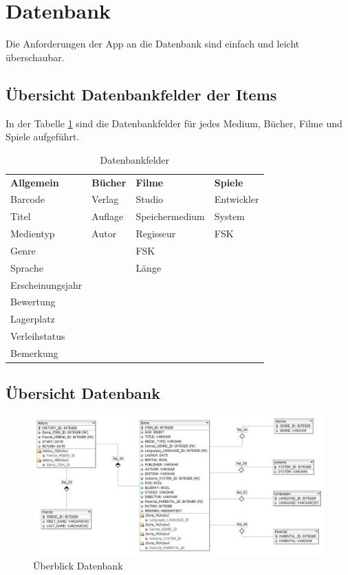 \section{Datenbank}

Die Anforderungen der App an die Datenbank sind einfach und leicht überschaubar.

\subsection{Übersicht Datenbankfelder der Items}
\label{sec:Felder}

In der Tabelle \ref{tab:Datenbankfelder}  sind die Datenbankfelder für jedes Medium, Bücher, Filme und Spiele aufgeführt.

\begin{table} [htbp]
	\begin{center}
		\begin{tabular}{|l|l|l|l|}
			\rowcolor{black} {\color{white}\textbf{Allgemein}} & {\color{white}\textbf{Bücher}} & {\color{white}\textbf{Filme}} & {\color{white}\textbf{Spiele}} \\
			Barcode & Verlag & Studio & Entwickler\\ \hline
			\rowcolor{DarkSeaGreen} Titel & Auflage & Speichermedium & System \\ \hline			Medientyp & Autor& Regisseur & FSK \\ \hline
			\rowcolor{DarkSeaGreen} Genre & & FSK & \\ \hline
			Sprache & & Länge & \\ \hline
			\rowcolor{DarkSeaGreen} Erscheinungsjahr & & & \\ \hline
			Bewertung & & & \\ \hline
			\rowcolor{DarkSeaGreen} Lagerplatz & & & \\ \hline
			Verleihstatus & & & \\ \hline
			\rowcolor{DarkSeaGreen} Bemerkung & & & \\ \hline		
		\end{tabular}
	\caption{Datenbankfelder}
	\label{tab:Datenbankfelder}
	\end{center}
\end{table}

\newpage

\begin{landscape}
	\section{Übersicht Datenbank}
	\label{sec:UebersichtDB}
	\begin{figure}[htbp]
		\centering
		\includegraphics[scale=0.75]{pic/DbDesign}
		\caption{Überblick Datenbank}
	\end{figure}
\end{landscape}